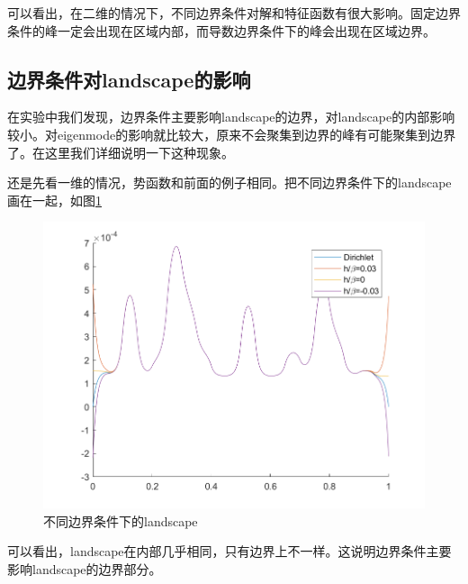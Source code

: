 \documentclass[12pt,a4paper]{article}
\begin{document}
可以看出，在二维的情况下，不同边界条件对解和特征函数有很大影响。固定边界条件的峰一定会出现在区域内部，而导数边界条件下的峰会出现在区域边界。

\subsection{边界条件对landscape的影响}

在实验中我们发现，边界条件主要影响landscape的边界，对landscape的内部影响较小。对eigenmode的影响就比较大，原来不会聚集到边界的峰有可能聚集到边界了。在这里我们详细说明一下这种现象。

还是先看一维的情况，势函数和前面的例子相同。把不同边界条件下的landscape画在一起，如图\ref{bdc-1d}

\begin{figure}[htbp]
\centering
\includegraphics[width=0.3\linewidth]{boundary/C1d}
\caption{不同边界条件下的landscape}
\label{bdc-1d}
\end{figure}

可以看出，landscape在内部几乎相同，只有边界上不一样。这说明边界条件主要影响landscape的边界部分。
\end{document}
